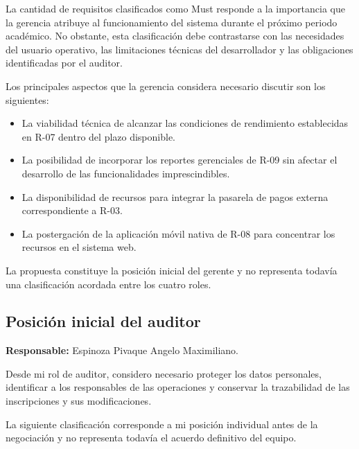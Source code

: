 \documentclass[12pt,a4paper]{article}
\begin{document}
La cantidad de requisitos clasificados como Must
responde a la importancia que la gerencia atribuye
al funcionamiento del sistema durante el próximo
periodo académico. No obstante, esta clasificación
debe contrastarse con las necesidades del usuario
operativo, las limitaciones técnicas del desarrollador
y las obligaciones identificadas por el auditor.

Los principales aspectos que la gerencia considera
necesario discutir son los siguientes:

\begin{itemize}[leftmargin=1.5em]

    \item La viabilidad técnica de alcanzar las
    condiciones de rendimiento establecidas en R-07
    dentro del plazo disponible.

    \item La posibilidad de incorporar los reportes
    gerenciales de R-09 sin afectar el desarrollo
    de las funcionalidades imprescindibles.

    \item La disponibilidad de recursos para integrar
    la pasarela de pagos externa correspondiente
    a R-03.

    \item La postergación de la aplicación móvil
    nativa de R-08 para concentrar los recursos
    en el sistema web.

\end{itemize}

La propuesta constituye la posición inicial del gerente
y no representa todavía una clasificación acordada
entre los cuatro roles.

\subsection{Posición inicial del auditor}

\textbf{Responsable:}
Espinoza Pivaque Angelo Maximiliano.

Desde mi rol de auditor, considero necesario proteger
los datos personales, identificar a los responsables
de las operaciones y conservar la trazabilidad de
las inscripciones y sus modificaciones.

La siguiente clasificación corresponde a mi posición
individual antes de la negociación y no representa
todavía el acuerdo definitivo del equipo.

\begingroup
\small
\singlespacing
\setlength{\tabcolsep}{4pt}
\end{document}
